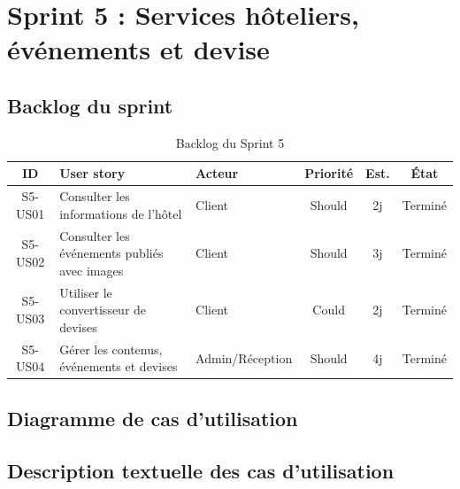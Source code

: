 \section{Sprint 5 : Services hôteliers, événements et devise}
\label{sec:sprint5}

\subsection{Backlog du sprint}
\begin{table}[H]
\centering
\caption{Backlog du Sprint 5}
\small
\begin{tabularx}{\textwidth}{|c|X|p{2.2cm}|c|c|c|}
\hline
\textbf{ID} & \textbf{User story} & \textbf{Acteur} & \textbf{Priorité} & \textbf{Est.} & \textbf{État} \\ \hline
S5-US01 & Consulter les informations de l'hôtel & Client & Should & 2j & Terminé \\ \hline
S5-US02 & Consulter les événements publiés avec images & Client & Should & 3j & Terminé \\ \hline
S5-US03 & Utiliser le convertisseur de devises & Client & Could & 2j & Terminé \\ \hline
S5-US04 & Gérer les contenus, événements et devises & Admin/Réception & Should & 4j & Terminé \\ \hline
\end{tabularx}
\end{table}

\subsection{Diagramme de cas d'utilisation}

\subsection{Description textuelle des cas d'utilisation}

